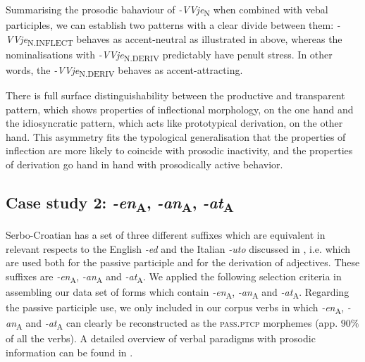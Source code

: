 \documentclass[output=paper]{langsci/langscibook}
\begin{document}
Summarising the prosodic bahaviour of \textit{-VVje}\textsubscript{N} when combined with vebal participles, we can establish two patterns with a clear divide between them: \mbox{\textit{-VVje}\textsubscript{N.INFLECT}} behaves as accent-neutral as illustrated in  above, whereas the nominalisations with \textit{-VVje}\textsubscript{N.DERIV} predictably have penult stress. In other words, the \textit{-VVje}\textsubscript{N.DERIV} behaves as accent-attracting. 

There is full surface distinguishability between the productive and transparent pattern, which shows properties of inflectional morphology, on the one hand and the idiosyncratic pattern, which acts like prototypical derivation, on the other hand. This asymmetry fits the typological generalisation that the properties of inflection are more likely to coincide with prosodic inactivity, and the properties of derivation go hand in hand with prosodically active behavior.


\subsection{Case study 2:  \textit{-en}\textsubscript{A}, \textit{-an}\textsubscript{A}, \textit{-at}\textsubscript{A}}\label{sec:simonovic:42}

Serbo-Croatian has a set of three different suffixes which are equivalent in relevant respects to the English \textit{-ed} and the Italian \textit{-uto }discussed in , i.e. which are used both for the passive participle and for the derivation of adjectives. These suffixes are \textit{-en}\textsubscript{A}, \textit{-an}\textsubscript{A} and \textit{-at}\textsubscript{A}. 
We applied the following selection criteria in assembling our data set of forms which contain \textit{{-en}}\textsubscript{A}, \textit{{-an}}\textsubscript{A} and \textit{{-at}}\textsubscript{A}. Regarding the passive participle use, we only included in our corpus verbs in which \textit{{-en}}\textsubscript{A}, \textit{{-an}}\textsubscript{A} and \textit{{-at}}\textsubscript{A} can clearly be reconstructed as the \textsc{pass.ptcp} morphemes (app. $90\%$  of all the verbs). A detailed overview of verbal paradigms with prosodic information can be found in \citet{Klaic2013}. 
\end{document}

